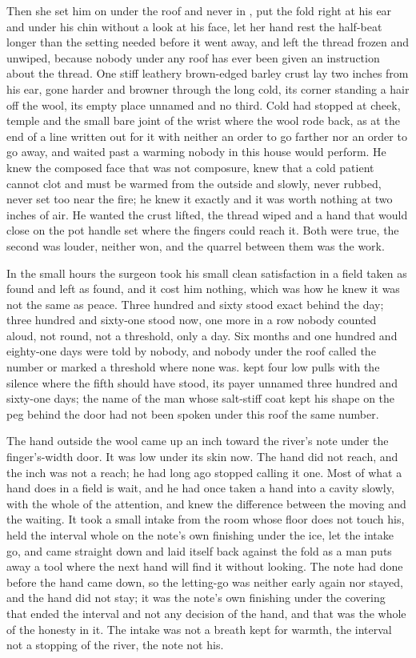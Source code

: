 Then she set him on  under the roof and never in , put the fold right at his ear and under his chin without a look at his face, let her hand rest the half-beat longer than the setting needed before it went away, and left the thread frozen and unwiped, because nobody under any roof has ever been given an instruction about the thread. One stiff leathery brown-edged barley crust lay two inches from his ear, gone harder and browner through the long cold, its corner standing a hair off the wool, its empty place unnamed and no third. Cold had stopped at cheek, temple and the small bare joint of the wrist where the wool rode back, as at the end of a line written out for it with neither an order to go farther nor an order to go away, and  waited past a warming nobody in this house would perform. He knew the composed face that was not composure, knew that a cold patient cannot clot and must be warmed from the outside and slowly, never rubbed, never set too near the fire; he knew it exactly and it was worth nothing at two inches of air. He wanted the crust lifted, the thread wiped and a hand that would close on the pot handle set where the fingers could reach it. Both were true, the second was louder, neither won, and the quarrel between them was the work.

In the small hours the surgeon took his small clean satisfaction in a field taken as found and left as found, and it cost him nothing, which was how he knew it was not the same as peace. Three hundred and sixty stood exact behind the day; three hundred and sixty-one stood now, one more in a row nobody counted aloud, not round, not a threshold, only a day. Six months and one hundred and eighty-one days were told by nobody, and nobody under the roof called the number or marked a threshold where none was.  kept four low pulls with the silence where the fifth should have stood, its payer unnamed three hundred and sixty-one days; the name of the man whose salt-stiff coat kept his shape on the peg behind the door had not been spoken under this roof the same number.

The hand outside the wool came up an inch toward the river's note under the finger's-width door. It was low under its skin now. The hand did not reach, and the inch was not a reach; he had long ago stopped calling it one. Most of what a hand does in a field is wait, and he had once taken a hand into a cavity slowly, with the whole of the attention, and knew the difference between the moving and the waiting. It took a small intake from the room whose floor does not touch his, held the interval whole on the note's own finishing under the ice, let the intake go, and came straight down and laid itself back against the fold as a man puts away a tool where the next hand will find it without looking. The note had done before the hand came down, so the letting-go was neither early again nor stayed, and the hand did not stay; it was the note's own finishing under the covering that ended the interval and not any decision of the hand, and that was the whole of the honesty in it. The intake was not a breath kept for warmth, the interval not a stopping of the river, the note not his.

